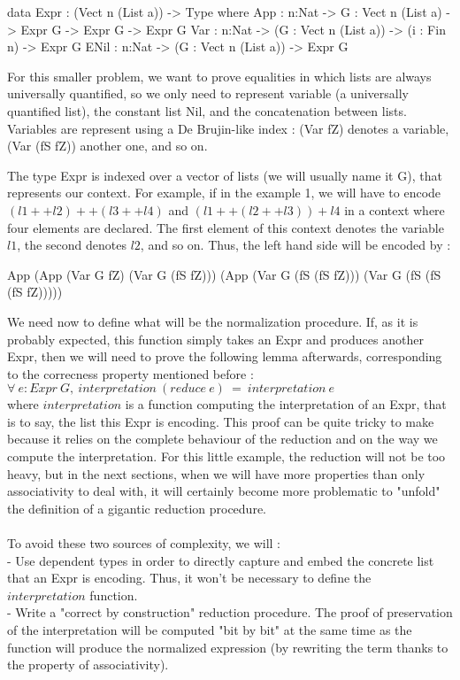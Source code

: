 \documentclass{sigplanconf}
\begin{document}
\begin{code}[caption=First version of reflected lists, captionpos=b, label=lst1:haskell2]
data Expr : (Vect n (List a)) -> Type where
  App  : {n:Nat} -> {G : Vect n (List a)} -> 
         Expr G -> Expr G -> Expr G 
  Var  : {n:Nat} -> (G : Vect n (List a)) -> 
         (i : Fin n) -> Expr G
  ENil : {n:Nat} -> (G : Vect n (List a)) -> 
         Expr G 
\end{code}

For this smaller problem, we want to prove equalities in which lists are always universally quantified, so we only need to represent variable (a universally quantified list), the constant list Nil, and the concatenation between lists.
Variables are represent using a De Brujin-like index : (Var fZ) denotes a variable, (Var (fS fZ)) another one, and so on.

The type Expr is indexed over a vector of lists (we will usually name it G), that represents our context. For example, if in the example 1, we will have to encode $(l1 ++ l2) ++ (l3 ++ l4)$ and $(l1 ++ (l2 ++ l3)) + l4$ in a context where four elements are declared. The first element of this context denotes the variable $l1$, the second denotes $l2$, and so on.
Thus, the left hand side will be encoded by :
\begin{code}[caption=Reflected LHS of example 1, captionpos=b, label=lst1:haskell2]
App (App (Var G fZ) 
         (Var G (fS fZ))) 
    (App (Var G (fS (fS fZ))) 
         (Var G (fS (fS (fS fZ)))))
\end{code}

We need now to define what will be the normalization procedure.
If, as it is probably expected, this function simply takes an Expr and produces another Expr, then we will need to prove the following lemma afterwards, corresponding to the correcness property mentioned before : \\
$\forall\ e:Expr\ G,\ interpretation\ (reduce\ e)\ =\ interpretation\ e$ \\
where $interpretation$ is a function computing the interpretation of an Expr, that is to say, the list this Expr is encoding.
This proof can be quite tricky to make because it relies on the complete behaviour of the reduction and on the way we compute the interpretation.
For this little example, the reduction will not be too heavy, but in the next sections, when we will have more properties than only associativity to deal with, it will certainly become more problematic to "unfold" the definition of a gigantic reduction procedure. \\
\\
To avoid these two sources of complexity, we will : \\
- Use dependent types in order to directly capture and embed the concrete list that an Expr is encoding. Thus, it won't be necessary to define the $interpretation$ function. \\
- Write a "correct by construction" reduction procedure. The proof of preservation of the interpretation will be computed "bit by bit" at the same time as the function will produce the normalized expression (by rewriting the term thanks to the property of associativity).
\end{document}

